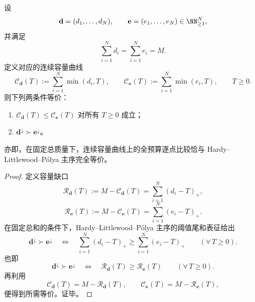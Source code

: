 \begin{theorem}[全预算容量序与主序等价]\label{thm:fold-capacity-order-majorization-equivalence}
设
\[
\mathbf d=(d_1,\dots,d_N),\qquad
\mathbf e=(e_1,\dots,e_N)\in\NN_{\ge 1}^N,
\]
并满足
\[
\sum_{i=1}^{N}d_i=\sum_{i=1}^{N}e_i=M.
\]
定义对应的连续容量曲线
\[
\mathcal C_{\mathbf d}(T):=\sum_{i=1}^{N}\min(d_i,T),
\qquad
\mathcal C_{\mathbf e}(T):=\sum_{i=1}^{N}\min(e_i,T),
\qquad T\ge 0.
\]
则下列两条件等价：
\begin{enumerate}
  \item \(\mathcal C_{\mathbf d}(T)\le \mathcal C_{\mathbf e}(T)\) 对所有 \(T\ge 0\) 成立；
  \item \(\mathbf d^\downarrow\succ \mathbf e^\downarrow\)。
\end{enumerate}
亦即，在固定总质量下，连续容量曲线上的全预算逐点比较恰与 Hardy--Littlewood--Pólya 主序完全等价。
\end{theorem}
\begin{proof}
定义容量缺口
\[
\mathcal R_{\mathbf d}(T):=M-\mathcal C_{\mathbf d}(T)=\sum_{i=1}^{N}(d_i-T)_+,
\]
\[
\mathcal R_{\mathbf e}(T):=M-\mathcal C_{\mathbf e}(T)=\sum_{i=1}^{N}(e_i-T)_+.
\]
在固定总和的条件下，Hardy--Littlewood--Pólya 主序的阈值尾和表征给出
\[
\mathbf d^\downarrow\succ \mathbf e^\downarrow
\quad\Longleftrightarrow\quad
\sum_{i=1}^{N}(d_i-T)_+\ge \sum_{i=1}^{N}(e_i-T)_+
\qquad(\forall\,T\ge 0).
\]
也即
\[
\mathbf d^\downarrow\succ \mathbf e^\downarrow
\quad\Longleftrightarrow\quad
\mathcal R_{\mathbf d}(T)\ge \mathcal R_{\mathbf e}(T)
\qquad(\forall\,T\ge 0).
\]
再利用
\[
\mathcal C_{\mathbf d}(T)=M-\mathcal R_{\mathbf d}(T),
\qquad
\mathcal C_{\mathbf e}(T)=M-\mathcal R_{\mathbf e}(T),
\]
便得到所需等价。证毕。
\end{proof}

